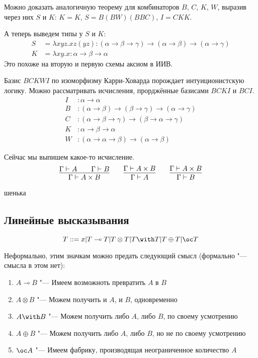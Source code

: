 Можно доказать аналогичную теорему для комбинаторов $B$, $C$, $K$, $W$, выразив через них $S$ и $K$:
$K = K$, $S = B (BW) (BBC)$, $I = CKK$.

А теперь выведем типы у $S$ и $K$:
\begin{align*}
    S &= \lambda x y z . x z (y z) : (\alpha \rightarrow \beta \rightarrow \gamma) \rightarrow
        (\alpha \rightarrow \beta) \rightarrow (\alpha \rightarrow \gamma) \\
    K &= \lambda x y . x : \alpha \rightarrow \beta \rightarrow \alpha
\end{align*}
Это похоже на вторую и первую схемы аксиом в ИИВ.

Базис $BCKWI$ по изоморфизму Карри-Ховарда порождает интуиционистскую логику.
Можно рассматривать исчисления, прорджённые базисами $BCKI$ и $BCI$.
\begin{align*}
    I &: \alpha \rightarrow \alpha \\
    B &: (\alpha \rightarrow \beta) \rightarrow (\beta \rightarrow \gamma) \rightarrow (\alpha \rightarrow \gamma) \\
    C &: (\alpha \rightarrow \beta \rightarrow \gamma) \rightarrow (\beta \rightarrow \alpha \rightarrow \gamma) \\
    K &: \alpha \rightarrow \beta \rightarrow \alpha \\
    W &: (\alpha \rightarrow \alpha \rightarrow \beta) \rightarrow (\alpha \rightarrow \beta)
\end{align*}

Сейчас мы выпишем какое-то исчисление.
\[
    \infer{\Gamma \vdash A \times B}{\Gamma \vdash A && \Gamma \vdash B} \qquad
    \infer{\Gamma \vdash A}{\Gamma \vdash A \times B} \qquad
    \infer{\Gamma \vdash B}{\Gamma \vdash A \times B}
\]

\todo{}шенька

\subsection{\texorpdfstring{Линейные высказывания}{Linear statements}}
\begin{definition}
    \begin{bnf}
    \[
        T ::= x | T \multimap T | T \otimes T | T \with T | T \oplus T | \oc T
    \]
    \end{bnf}
\end{definition}
Неформально, этим значкам можно предать следующий смысл (формально "--- смысла в этом нет):
\begin{enumerate}
	\item $A \multimap B$  "--- Имеем возможноть превратить $A$ в $B$
	\item $A \otimes B$ "--- Можем получить и $A$, и $B$, одновременно
	\item $A \with B$ "--- Можем получить либо $A$, либо $B$, по своему усмотрению
	\item $A \oplus B$ "--- Можем получить либо $A$, либо $B$, но не по своему усмотрению
	\item $\oc A$ "--- Имеем фабрику, производящая  неограниченное количество $A$
\end{enumerate}

